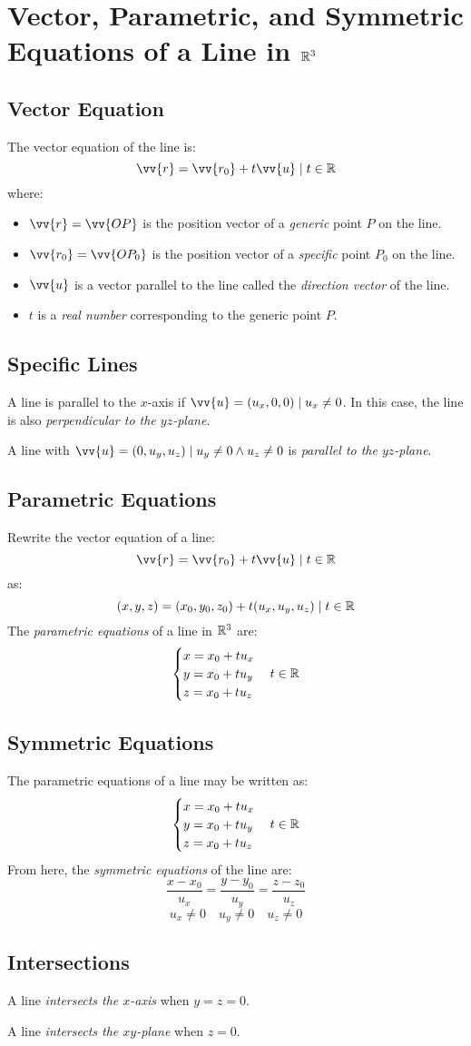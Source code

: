 \section{Vector, Parametric, and Symmetric Equations of a Line in $\mathbb{R}^3$}
\subsection{Vector Equation}
	The vector equation of the line is:
	\[\vv{r} = \vv{r_0} + t\vv{u} \such t \in \real\]
	where:
	\begin{itemize}
		\item $\vv{r} = \vv{OP}$ is the position vector of a \emph{generic} point $P$ on the line.
		\item $\vv{r_0} = \vv{OP_0}$ is the position vector of a \emph{specific} point $P_0$ on the line.
		\item $\vv{u}$ is a vector parallel to the line called the \emph{direction vector} of the line.
		\item $t$ is a \emph{real number} corresponding to the generic point $P$.
	\end{itemize}
\subsection{Specific Lines}
	A line is parallel to the $x$-axis if $\vv{u} = (u_x, 0, 0) \such u_x \neq 0$.
	In this case, the line is also \emph{perpendicular to the $yz$-plane}.

	A line with $\vv{u} = (0, u_y, u_z) \such u_y \neq 0 \land u_z \neq 0$ is \emph{parallel to the $yz$-plane}.
\subsection{Parametric Equations}
	Rewrite the vector equation of a line:
	\[\vv{r} = \vv{r_0} + t\vv{u} \such t \in \real\]
	as:
	\[(x,y,z) = (x_0,y_0,z_0) + t(u_x,u_y,u_z) \mid t \in \mathbb{R}\]
	The \emph{parametric equations} of a line in $\mathbb{R}^3$ are:
	\begin{equation*}
		\begin{cases}
			x = x_0 + tu_x\\
			y = x_0 + tu_y\\
			z = x_0 + tu_z
		\end{cases}
		t \in \mathbb{R}
	\end{equation*}
\subsection{Symmetric Equations}
	The parametric equations of a line may be written as:
	\begin{equation*}
		\begin{cases}
			x = x_0 + tu_x\\
			y = x_0 + tu_y\\
			z = x_0 + tu_z
		\end{cases}
		t \in \mathbb{R}
	\end{equation*}
	From here, the \emph{symmetric equations} of the line are:
	\[\frac{x - x_0}{u_x} = \frac{y - y_0}{u_y} = \frac{z - z_0}{u_z}\]
	\[u_x \neq 0 \quad u_y \neq 0 \quad u_z \neq 0\]
\subsection{Intersections}
	A line \emph{intersects the $x$-axis} when $y=z=0$.

	A line \emph{intersects the $xy$-plane} when $z=0$.
